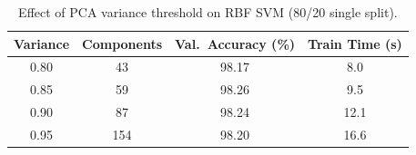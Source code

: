 \begin{table}[h]
\centering
\caption{Effect of PCA variance threshold on RBF SVM (80/20 single split).}
\label{tab:pca_sweep}
\begin{tabular}{cccc}
\toprule
Variance & Components & Val.\ Accuracy (\%) & Train Time (s) \\
\midrule
0.80 & 43 & 98.17 & 8.0 \\
0.85 & 59 & 98.26 & 9.5 \\
0.90 & 87 & 98.24 & 12.1 \\
0.95 & 154 & 98.20 & 16.6 \\
\bottomrule
\end{tabular}
\end{table}
